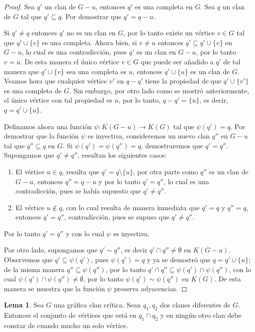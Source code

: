 \documentclass[12pt]{book}
\theoremstyle{definition}
\newtheorem{Lem}[theorem]{Lema}
\begin{document}
\begin{proof}
Sea $q'$ un clan de $G-u$, entonces $q'$ es una completa en $G$. Sea $q$ un clan de $G$ tal que $q'\subseteq q$. Por demostrar que $q'=q-u$.

Si $q'\neq q$ entonces $q'$ no es un clan en $G$, por lo tanto existe un vértice $v\in G$ tal que $q' \cup \{v\}$ es una completa. Ahora bien, si $v\neq u$ entonces $q'\subseteq q' \cup \{v\}$ en $G-u$, lo cual es una contradicción, pues $q'$ es un clan en $G-u$, por lo tanto $v=u$. De esta manera el único vértice $v\in G$ que puede ser añadido a $q'$ de tal manera que $q'\cup \{v\}$ sea una completa es $u$, entonces $q'\cup \{u\}$ es un clan de $G$.
Veamos hora que cualquier vértice $v'$ en $q-q'$ tiene la propiedad de que $q'\cup \{v'\}$ es una completa de $G$. Sin embargo, por otro lado como se mostró anteriormente, el único vértice con tal propiedad es $u$, por lo tanto, $q-q'=\{u\}$, es decir, $q=q'\cup\{u\}$.

Definamos ahora una función $\psi:K(G-u)\to K(G)$ tal que $\psi(q')=q$. Por demostrar que la función $\psi$ es inyectiva, consideremos un nuevo clan $q''$ en $G-u$ tal que $q''\subseteq q$ en $G$. Si $\psi(q')=\psi(q'')=q$, demostraremos que $q'=q''$. Supongamos que $q'\neq q''$, resultan los siguientes casos:
\begin{enumerate}
\item El vértice $u\in q$, resulta que $q'=q\setminus \{u\}$, por otra parte como $q''$ es un clan de $G-u$, entonces $q''=q-u$ y por lo tanto $q'=q''$, lo cual es una contradicción, pues se había supuesto que $q'\neq q''$.
\item El vértice $u \notin q$, con lo cual resulta de manera inmediata que $q'=q$ y $q''=q$, entonces $q'=q''$, contradicción, pues se supuso que $q'\neq q''$.
\end{enumerate}
Por lo tanto $q'=q''$ y con lo cual $\psi$ es inyectiva.

Por otro lado, supongamos que $q'\sim q''$, es decir $q'\cap q''\neq\emptyset$ en $K(G-u)$. Observemos que $q'\subseteq\psi(q')$, pues $\psi(q')=q$ y ya se demostró que $q=q'\cup\{u\}$; de la misma manera $q''\subseteq\psi(q'')$, por lo tanto $q'\cap q''\subseteq\psi(q')\cap\psi(q'')$, con lo cual $\psi(q')\cap\psi(q'')\neq\emptyset$, por lo tanto $\psi(q')\sim\psi(q'')$ en $K(G)$. De esta manera se muestra que la función $\psi$ preserva adyacencias.

\end{proof}

\begin{Lem}\label{L1.15}
Sea $G$ una gráfica clan crítica. Sean $q_1,q_2$ dos clanes diferentes de $G$. Entonces el conjunto de vértices que está en $q_1\cap q_2$ y en ningún otro clan debe constar de cuando mucho un solo vértice.
\end{Lem}
\end{document}
